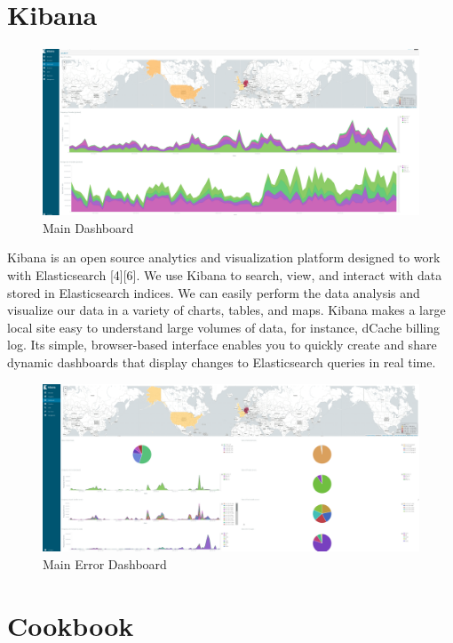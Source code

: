 \documentclass[]{article}
\begin{document}
\section{Kibana}\label{kibana}

\begin{figure}[htbp]
\centering
\includegraphics{images/kibana.png}
\caption{Main Dashboard}
\end{figure}

Kibana is an open source analytics and visualization platform designed
to work with Elasticsearch {[}4{]}{[}6{]}. We use Kibana to search,
view, and interact with data stored in Elasticsearch indices. We can
easily perform the data analysis and visualize our data in a variety of
charts, tables, and maps. Kibana makes a large local site easy to
understand large volumes of data, for instance, dCache billing log. Its
simple, browser-based interface enables you to quickly create and share
dynamic dashboards that display changes to Elasticsearch queries in real
time.

\begin{figure}[htbp]
\centering
\includegraphics{images/kibana_error.png}
\caption{Main Error Dashboard}
\end{figure}

\section{Cookbook}\label{cookbook}
\end{document}
